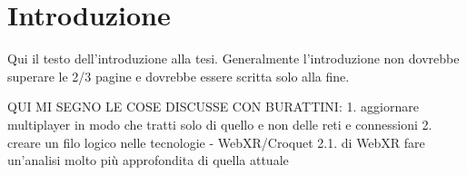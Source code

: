 \chapter{Introduzione}

Qui il testo dell'introduzione alla tesi. Generalmente l'introduzione non dovrebbe superare le 2/3 pagine e dovrebbe essere scritta solo alla fine.

QUI MI SEGNO LE COSE DISCUSSE CON BURATTINI:
1. aggiornare multiplayer in modo che tratti solo di quello e non delle reti e connessioni
2. creare un filo logico nelle tecnologie - WebXR/Croquet
2.1. di WebXR fare un'analisi molto più approfondita di quella attuale